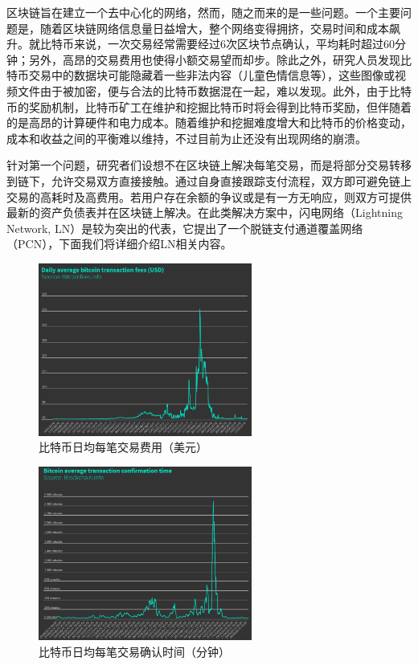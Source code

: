 \documentclass[12pt,a4paper]{article}
\begin{document}
区块链旨在建立一个去中心化的网络，然而，随之而来的是一些问题\cite{blockchain_problem}。一个主要问题是，随着区块链网络信息量日益增大，整个网络变得拥挤，交易时间和成本飙升。就比特币来说，一次交易经常需要经过6次区块节点确认，平均耗时超过60分钟；另外，高昂的交易费用也使得小额交易望而却步。除此之外，研究人员发现比特币交易中的数据块可能隐藏着一些非法内容（儿童色情信息等），这些图像或视频文件由于被加密，便与合法的比特币数据混在一起，难以发现。此外，由于比特币的奖励机制，比特币矿工在维护和挖掘比特币时将会得到比特币奖励，但伴随着的是高昂的计算硬件和电力成本。随着维护和挖掘难度增大和比特币的价格变动，成本和收益之间的平衡难以维持，不过目前为止还没有出现网络的崩溃。

针对第一个问题，研究者们设想不在区块链上解决每笔交易，而是将部分交易转移到链下，允许交易双方直接接触。通过自身直接跟踪支付流程，双方即可避免链上交易的高耗时及高费用。若用户存在余额的争议或是有一方无响应，则双方可提供最新的资产负债表并在区块链上解决。在此类解决方案中，闪电网络（Lightning Network, LN）是较为突出的代表，它提出了一个脱链支付通道覆盖网络（PCN），下面我们将详细介绍LN相关内容。


\begin{figure}[htb]
\centering
\includegraphics[width=7cm]{fee}
\caption{比特币日均每笔交易费用（美元）}
\end{figure}

\begin{figure}[htb]
\centering
\includegraphics[width=7cm]{time}
\caption{比特币日均每笔交易确认时间（分钟）}
\end{figure}
\end{document}
